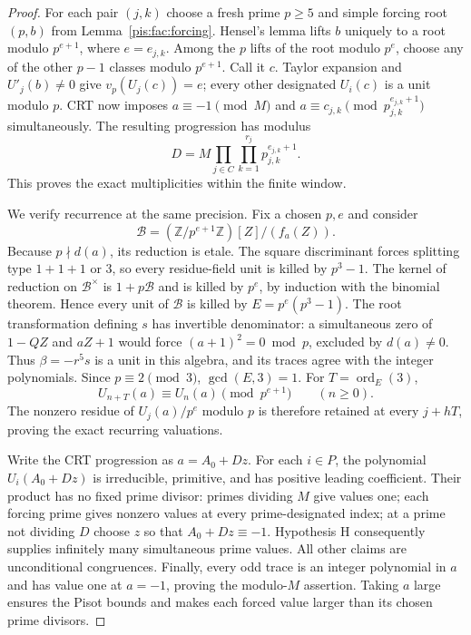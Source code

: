\documentclass[11pt,a4paper]{article}
\theoremstyle{definition}\newtheorem{definition}[theorem]{Definition}
\theoremstyle{remark}\newtheorem{remark}[theorem]{Remark}
\begin{document}
\begin{proof}
For each pair $(j,k)$ choose a fresh prime $p\ge5$ and simple forcing root
$(p,b)$ from Lemma~\ref{pis:fac:forcing}. Hensel's lemma lifts $b$ uniquely
to a root modulo $p^{e+1}$, where $e=e_{j,k}$. Among the $p$ lifts of
the root modulo $p^e$, choose any of the other $p-1$ classes modulo
$p^{e+1}$. Call it $c$. Taylor expansion and $U'_j(b)\ne0$ give
$v_p(U_j(c))=e$; every other designated $U_i(c)$ is a unit modulo $p$.
CRT now imposes $a\equiv-1\pmod M$ and
$a\equiv c_{j,k}\pmod{p_{j,k}^{e_{j,k}+1}}$ simultaneously. The resulting
progression has modulus
\[
 D=M\prod_{j\in C}\prod_{k=1}^{r_j}p_{j,k}^{e_{j,k}+1}.
\]
This proves the exact multiplicities within the finite window.

We verify recurrence at the same precision. Fix a chosen $p,e$ and
consider
\[
 \mathcal B=(\mathbb Z/p^{e+1}\mathbb Z)[Z]/(f_a(Z)).
\]
Because $p\nmid d(a)$, its reduction is etale. The square discriminant
forces splitting type $1+1+1$ or $3$, so every residue-field unit is
killed by $p^3-1$. The kernel of reduction on $\mathcal B^\times$ is
$1+p\mathcal B$ and is killed by $p^e$, by induction with the binomial
theorem. Hence every unit of $\mathcal B$ is killed by
$E=p^e(p^3-1)$. The root transformation defining $s$ has invertible
denominator: a simultaneous zero of $1-QZ$ and $aZ+1$ would force
$(a+1)^2=0\bmod p$, excluded by $d(a)\ne0$. Thus $\beta=-r^5s$ is a unit
in this algebra, and its traces agree with the integer polynomials.
Since $p\equiv2\pmod3$, $\gcd(E,3)=1$. For $T=\operatorname{ord}_E(3)$,
\[
 U_{n+T}(a)\equiv U_n(a)\pmod{p^{e+1}}\qquad(n\ge0).
\]
The nonzero residue of $U_j(a)/p^e$ modulo $p$ is therefore retained
at every $j+hT$, proving the exact recurring valuations.

Write the CRT progression as $a=A_0+Dz$. For each $i\in P$, the
polynomial $U_i(A_0+Dz)$ is irreducible, primitive, and has positive
leading coefficient. Their product has no fixed prime divisor:
primes dividing $M$ give values one; each forcing prime gives nonzero
values at every prime-designated index; at a prime not dividing $D$
choose $z$ so that $A_0+Dz\equiv-1$. Hypothesis H consequently supplies
infinitely many simultaneous prime values. All other claims are
unconditional congruences. Finally, every odd trace is an integer
polynomial in $a$ and has value one at $a=-1$, proving the modulo-$M$
assertion. Taking $a$ large ensures the Pisot bounds and makes each
forced value larger than its chosen prime divisors.
\end{proof}
\end{document}
